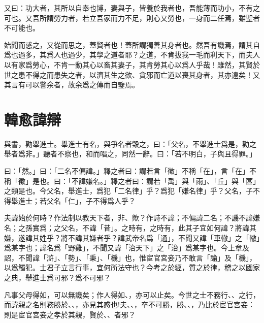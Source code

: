 又曰：功大者，其所以自奉也博，妻與子，皆養於我者也，吾能薄而功小，不有之可也。又吾所謂勞力者，若立吾家而力不足，則心又勞也，一身而二任焉，雖聖者不可{能}也。

始聞而惑之，又從而思之，蓋賢者也！蓋所謂獨善其身者也。然吾有譏焉，謂其自爲也過多，其爲人也過少，其學之道者耶？之道，不肯拔我一毛而利天下，而夫人以有家爲勞心，不肯一動其心以畜其妻子，其肯勞其心以爲人乎哉！雖然，其賢於世之患不得之而患失之者，以濟其生之欲、貪邪而亡道以喪其身者，其亦遠矣！又其言有可以警余者，故余爲之傳而自鑒焉。

\theendnotes

\section[諱辯\quad{\small 韓愈}]{{\normalsize 韓愈}\quad 諱辯}
與書，勸舉進士。舉進士有名，與爭名者毀之，曰：「父名，不舉進士爲是，勸之舉者爲非。」聽者不察也，和而唱之，同然一辭。曰：「若不明白，子與且得罪。」

曰：「然。」曰：「二名不偏諱。」釋之者曰：謂若言「徵」不稱「在」，言「在」不稱「徵」是也。曰：「不諱嫌名。」釋之者曰：謂若「禹」與「雨」、「丘」與「蓲」之類是也。今父名，舉進士，爲犯「二名律」乎？爲犯「嫌名律」乎？父名，子不得舉進士；若父名「仁」，子不得爲人乎？

夫諱始於何時？作法制以教天下者，非、歟？作詩不諱；不偏諱二名；不譏不諱嫌名；之孫實爲；之父名，不諱「昔」。之時有，之時有，此其子宜如何諱？將諱其嫌，遂諱其姓乎？將不諱其嫌者乎？諱武帝名爲「通」，不聞又諱「車轍」之「轍」爲某字也；諱名爲「野雞」，不聞又諱「治天下」之「治」爲某字也。今上章及詔，不聞諱「滸」、「勢」、「秉」、「機」也，惟宦官宮妾乃不敢言「諭」及「機」，以爲觸犯。士君子立言行事，宜何所法守也？今考之於經，質之於律，稽之以國家之典，舉進士爲可邪？爲不可邪？

凡事父母得如，可以無譏矣；作人得如、，亦可以止矣。今世之士不務行、、之行，而諱親之名則務勝於、、，亦見其惑也!夫、、，卒不可勝，勝、、，乃比於宦官宮妾：則是宦官宮妾之孝於其親，賢於、、者邪？

